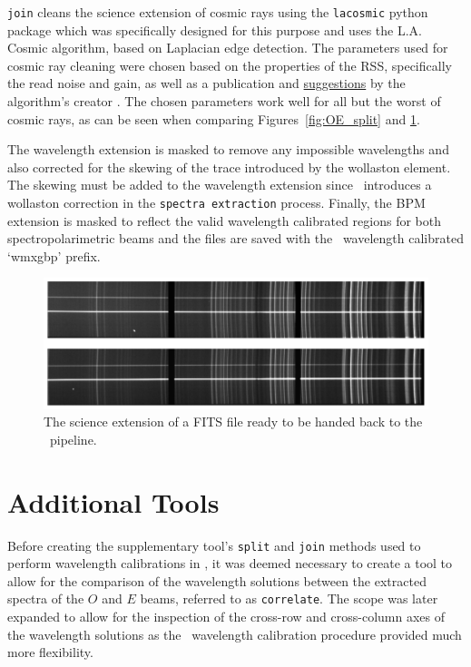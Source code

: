 \texttt{join} cleans the science extension of cosmic rays using the \texttt{lacosmic} python package which was specifically designed for this purpose and uses the L.A. Cosmic algorithm, based on Laplacian edge detection. The parameters used for cosmic ray cleaning were chosen based on the properties of the \gls{RSS}, specifically the read noise and gain, as well as a publication and \hyperlink{http://www.astro.yale.edu/dokkum/lacosmic/pars.html}{suggestions} by the algorithm's creator \citep{lacosmic}. The chosen parameters work well for all but the worst of cosmic rays, as can be seen when comparing Figures~\ref{fig:OE_split} and \ref{fig:polsalt_post_wav_cal}.
\prgph

The wavelength extension is masked to remove any impossible wavelengths and also corrected for the skewing of the trace introduced by the wollaston element. The skewing must be added to the wavelength extension since \polsalt\ introduces a wollaston correction in the \texttt{spectra extraction} process. Finally, the \gls{BPM} extension is masked to reflect the valid wavelength calibrated regions for both spectropolarimetric beams and the files are saved with the \polsalt\ wavelength calibrated `wmxgbp' prefix.

\begin{figure}[t]
    \centering
    \includegraphics[width = 1.0\textwidth]{figures/3_post_wav_cal.pdf}
    \caption{The science extension of a \gls{FITS} file ready to be handed back to the \polsalt\ pipeline.}
    \label{fig:polsalt_post_wav_cal}
\end{figure}


\section{Additional Tools}\label{sec:add_tools}

Before creating the supplementary tool's \texttt{split} and \texttt{join} methods used to perform wavelength calibrations in \iraf, it was deemed necessary to create a tool to allow for the comparison of the wavelength solutions between the extracted spectra of the $O$ and $E$ beams, referred to as \texttt{correlate}. The scope was later expanded to allow for the inspection of the cross-row and cross-column axes of the wavelength solutions as the \iraf\ wavelength calibration procedure provided much more flexibility.


